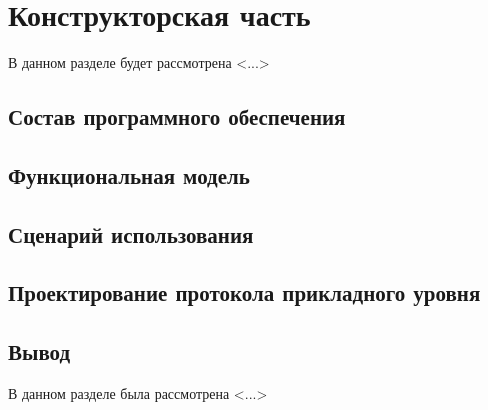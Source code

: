 \chapter{Конструкторская часть}

В данном разделе будет рассмотрена <...>

\section{Состав программного обеспечения}

\section{Функциональная модель}

\section{Сценарий использования}

\section{Проектирование протокола прикладного уровня}

\section*{Вывод}

В данном разделе была рассмотрена <...>

